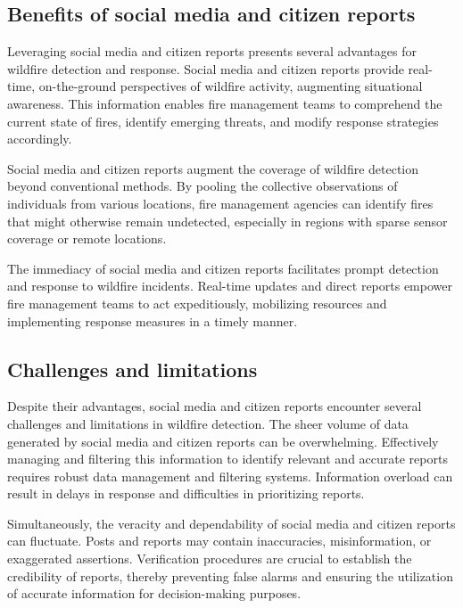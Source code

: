\documentclass[
  12 pt,
]{Nemilov}
\begin{document}
\subsection{Benefits of social media and citizen reports}\label{benefits-of-social-media-and-citizen-reports}

Leveraging social media and citizen reports presents several advantages for wildfire detection and response. Social media and citizen reports provide real-time, on-the-ground perspectives of wildfire activity, augmenting situational awareness. This information enables fire management teams to comprehend the current state of fires, identify emerging threats, and modify response strategies accordingly.

Social media and citizen reports augment the coverage of wildfire detection beyond conventional methods. By pooling the collective observations of individuals from various locations, fire management agencies can identify fires that might otherwise remain undetected, especially in regions with sparse sensor coverage or remote locations.

The immediacy of social media and citizen reports facilitates prompt detection and response to wildfire incidents. Real-time updates and direct reports empower fire management teams to act expeditiously, mobilizing resources and implementing response measures in a timely manner.

\subsection{Challenges and limitations}\label{challenges-and-limitations-3}

Despite their advantages, social media and citizen reports encounter several challenges and limitations in wildfire detection. The sheer volume of data generated by social media and citizen reports can be overwhelming. Effectively managing and filtering this information to identify relevant and accurate reports requires robust data management and filtering systems. Information overload can result in delays in response and difficulties in prioritizing reports.

Simultaneously, the veracity and dependability of social media and citizen reports can fluctuate. Posts and reports may contain inaccuracies, misinformation, or exaggerated assertions. Verification procedures are crucial to establish the credibility of reports, thereby preventing false alarms and ensuring the utilization of accurate information for decision-making purposes.
\end{document}
